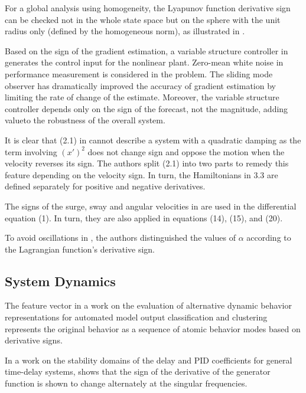 \documentclass[11pt]{book}
\begin{document}
For a global analysis using homogeneity, the Lyapunov function derivative
sign can be checked not in the whole state space but on the sphere
with the unit radius only (defined by the homogeneous norm), as illustrated
in \cite{efimov2016conditions}.

Based on the sign of the gradient estimation, a variable structure
controller in \cite{attallah2017histogram} generates the control
input for the nonlinear plant. Zero-mean white noise in performance
measurement is considered in the problem. The sliding mode observer
has dramatically improved the accuracy of gradient estimation by limiting
the rate of change of the estimate. Moreover, the variable structure
controller depends only on the sign of the forecast, not the magnitude,
adding valueto the robustness of the overall system.

It is clear that (2.1) in \cite{pandey2017chiellini} cannot describe
a system with a quadratic damping as the term involving $\left(x'\right)^{2}$
does not change sign and oppose the motion when the velocity reverses
its sign. The authors split (2.1) into two parts to remedy this feature
depending on the velocity sign. In turn, the Hamiltonians in 3.3 are
defined separately for positive and negative derivatives.

The signs of the surge, sway and angular velocities in \cite{karami2019adaptive}
are used in the differential equation (1). In turn, they are also
applied in equations (14), (15), and (20).

To avoid oscillations in \cite{nikolaidis2020enhanced}, the authors
distinguished the values of $\alpha$ according to the Lagrangian
function's derivative sign.


\subsection{System Dynamics}

The feature vector in a work on the evaluation of alternative dynamic behavior representations for automated model output classification and clustering \cite{onsel2013evaluation} represents the original
behavior as a sequence of atomic behavior modes based on derivative
signs.

In a work on the stability domains of
the delay and PID coefficients for general time-delay systems, \cite{almodaresi2016stability} shows that the sign of the derivative of the generator function is shown to change alternately at the singular frequencies.
\end{document}
